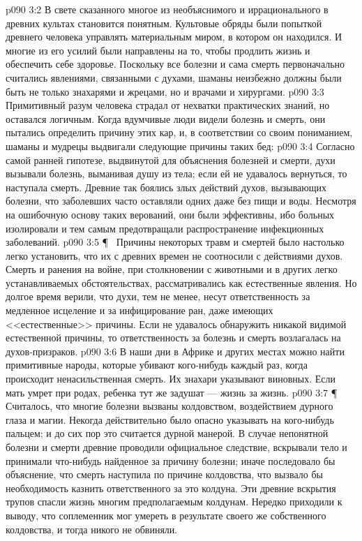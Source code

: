 \vs p090 3:2 В свете сказанного многое из необъяснимого и иррационального в древних культах становится понятным. Культовые обряды были попыткой древнего человека управлять материальным миром, в котором он находился. И многие из его усилий были направлены на то, чтобы продлить жизнь и обеспечить себе здоровье. Поскольку все болезни и сама смерть первоначально считались явлениями, связанными с духами, шаманы неизбежно должны были быть не только знахарями и жрецами, но и врачами и хирургами.
\vs p090 3:3 Примитивный разум человека страдал от нехватки практических знаний, но оставался логичным. Когда вдумчивые люди видели болезнь и смерть, они пытались определить причину этих кар, и, в соответствии со своим пониманием, шаманы и мудрецы выдвигали следующие причины таких бед:
\vs p090 3:4 \bibnobreakspace {} Согласно самой ранней гипотезе, выдвинутой для объяснения болезней и смерти, духи вызывали болезнь, выманивая душу из тела; если ей не удавалось вернуться, то наступала смерть. Древние так боялись злых действий духов, вызывающих болезни, что заболевших часто оставляли одних даже без пищи и воды. Несмотря на ошибочную основу таких верований, они были эффективны, ибо больных изолировали и тем самым предотвращали распространение инфекционных заболеваний.
\vs p090 3:5 \P\ \bibnobreakspace {} Причины некоторых травм и смертей было настолько легко установить, что их с древних времен не соотносили с действиями духов. Смерть и ранения на войне, при столкновении с животными и в других легко устанавливаемых обстоятельствах, рассматривались как естественные явления. Но долгое время верили, что духи, тем не менее, несут ответственность за медленное исцеление и за инфицирование ран, даже имеющих <<естественные>> причины. Если не удавалось обнаружить никакой видимой естественной причины, то ответственность за болезнь и смерть возлагалась на духов\hyp{}призраков.
\vs p090 3:6 В наши дни в Африке и других местах можно найти примитивные народы, которые убивают кого\hyp{}нибудь каждый раз, когда происходит ненасильственная смерть. Их знахари указывают виновных. Если мать умрет при родах, ребенка тут же задушат --- жизнь за жизнь.
\vs p090 3:7 \P\ \bibnobreakspace {} Считалось, что многие болезни вызваны колдовством, воздействием дурного глаза и магии. Некогда действительно было опасно указывать на кого\hyp{}нибудь пальцем; и до сих пор это считается дурной манерой. В случае непонятной болезни и смерти древние проводили официальное следствие, вскрывали тело и принимали что\hyp{}нибудь найденное за причину болезни; иначе последовало бы объяснение, что смерть наступила по причине колдовства, что вызвало бы необходимость казнить ответственного за это колдуна. Эти древние вскрытия трупов спасли жизнь многим предполагаемым колдунам. Нередко приходили к выводу, что соплеменник мог умереть в результате своего же собственного колдовства, и тогда никого не обвиняли.
